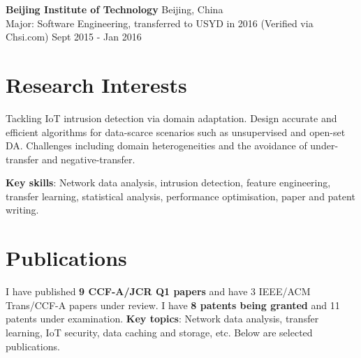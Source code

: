 \documentclass[letterpaper,10.9pt]{article}
\begin{document}
\vspace{8pt}

\textbf{Beijing Institute of Technology} \hfill Beijing, China\\
Major: Software Engineering, transferred to USYD in 2016 (Verified via Chsi.com) \hfill Sept 2015 - Jan 2016\\





\section{\textbf{Research Interests}}

Tackling IoT intrusion detection via domain adaptation. Design accurate and efficient algorithms for data-scarce scenarios such as unsupervised and open-set DA. Challenges including domain heterogeneities and the avoidance of under-transfer and negative-transfer. 

\textbf{Key skills}: Network data analysis, intrusion detection, feature engineering, transfer learning, statistical analysis, performance optimisation, paper and patent writing. 





\section{\textbf{Publications}}

I have published \textbf{9 CCF-A/JCR Q1 papers} and have 3 IEEE/ACM Trans/CCF-A papers under review. I have \textbf{8 patents being granted} and 11 patents under examination. \textbf{Key topics}: Network data analysis, transfer learning, IoT security, data caching and storage, etc. Below are selected publications. 
\end{document}
